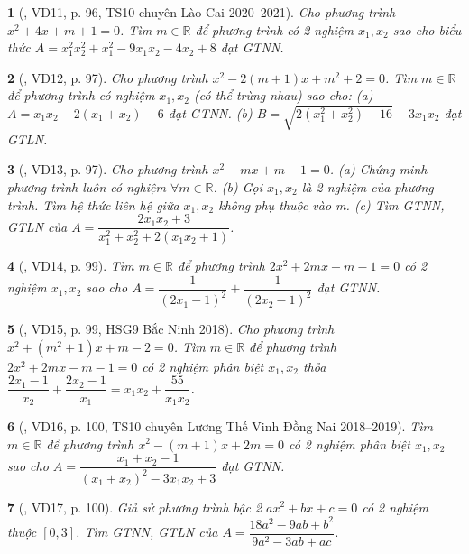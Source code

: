 \documentclass{article}
\newtheorem{baitoan}{}
\begin{document}
\begin{baitoan}[\cite{Thu_Viet_Minh_ptb2}, VD11, p. 96, TS10 chuyên Lào Cai 2020--2021]
	Cho phương trình $x^2 + 4x + m + 1 = 0$. Tìm $m\in\mathbb{R}$ để phương trình có 2 nghiệm $x_1,x_2$ sao cho biểu thức $A = x_1^2x_2^2 + x_1^2 - 9x_1x_2 - 4x_2 + 8$ đạt {\rm GTNN}.
\end{baitoan}

\begin{baitoan}[\cite{Thu_Viet_Minh_ptb2}, VD12, p. 97]
	Cho phương trình $x^2 - 2(m + 1)x + m^2 + 2 = 0$. Tìm $m\in\mathbb{R}$ để phương trình có nghiệm $x_1,x_2$ (có thể trùng nhau) sao cho: (a) $A = x_1x_2 - 2(x_1 + x_2) - 6$ đạt {\rm GTNN}. (b) $B =  \sqrt{2(x_1^2 + x_2^2) + 16} - 3x_1x_2$ đạt {\rm GTLN}.
\end{baitoan}

\begin{baitoan}[\cite{Thu_Viet_Minh_ptb2}, VD13, p. 97]
	Cho phương trình $x^2 - mx + m - 1 = 0$. (a) Chứng minh phương trình luôn có nghiệm $\forall m\in\mathbb{R}$. (b) Gọi $x_1,x_2$ là 2 nghiệm của phương trình. Tìm hệ thức liên hệ giữa $x_1,x_2$ không phụ thuộc vào m. (c) Tìm {\rm GTNN, GTLN} của $A = \dfrac{2x_1x_2 + 3}{x_1^2 + x_2^2 + 2(x_1x_2 + 1)}$.
\end{baitoan}

\begin{baitoan}[\cite{Thu_Viet_Minh_ptb2}, VD14, p. 99]
	Tìm $m\in\mathbb{R}$ để phương trình $2x^2 + 2mx - m - 1 = 0$ có 2 nghiệm $x_1,x_2$ sao cho $A = \dfrac{1}{(2x_1 - 1)^2} + \dfrac{1}{(2x_2 - 1)^2}$ đạt {\rm GTNN}.
\end{baitoan}

\begin{baitoan}[\cite{Thu_Viet_Minh_ptb2}, VD15, p. 99, HSG9 Bắc Ninh 2018]
	Cho phương trình $x^2 + (m^2 + 1)x + m - 2 = 0$. Tìm $m\in\mathbb{R}$ để phương trình $2x^2 + 2mx - m - 1 = 0$ có 2 nghiệm phân biệt $x_1,x_2$ thỏa $\dfrac{2x_1 - 1}{x_2} + \dfrac{2x_2 - 1}{x_1} = x_1x_2 + \dfrac{55}{x_1x_2}$.
\end{baitoan}

\begin{baitoan}[\cite{Thu_Viet_Minh_ptb2}, VD16, p. 100, TS10 chuyên Lương Thế Vinh Đồng Nai 2018--2019]
	Tìm $m\in\mathbb{R}$ để phương trình $x^2 - (m + 1)x + 2m = 0$ có 2 nghiệm phân biệt $x_1,x_2$ sao cho $A = \dfrac{x_1 + x_2 - 1}{(x_1 + x_2)^2 - 3x_1x_2 + 3}$ đạt {\rm GTNN}.
\end{baitoan}

\begin{baitoan}[\cite{Thu_Viet_Minh_ptb2}, VD17, p. 100]
	Giả sử phương trình bậc 2 $ax^2 + bx + c = 0$ có 2 nghiệm thuộc $[0,3]$. Tìm {\rm GTNN, GTLN} của $A = \dfrac{18a^2 - 9ab + b^2}{9a^2 - 3ab + ac}$.
\end{baitoan}
\end{document}
